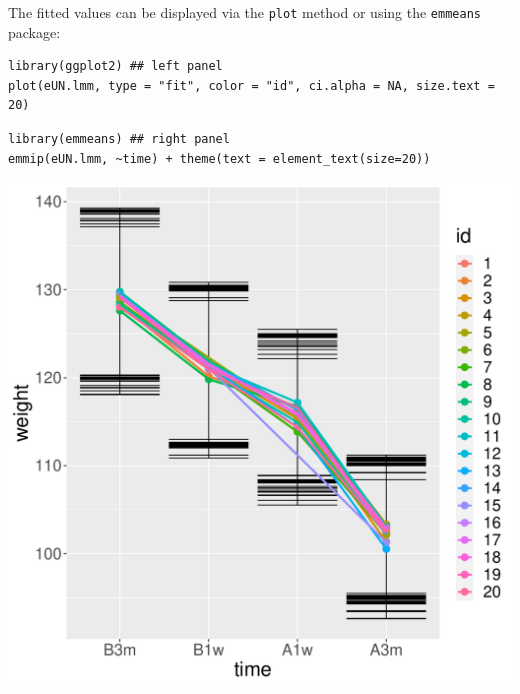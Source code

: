 \documentclass[12pt]{article}
\begin{document}
The fitted values can be displayed via the \texttt{plot} method or using the \texttt{emmeans} package:

\lstset{language=r,label= ,caption= ,captionpos=b,numbers=none}
\begin{lstlisting}
library(ggplot2) ## left panel
plot(eUN.lmm, type = "fit", color = "id", ci.alpha = NA, size.text = 20)
\end{lstlisting}

\lstset{language=r,label= ,caption= ,captionpos=b,numbers=none}
\begin{lstlisting}
library(emmeans) ## right panel
emmip(eUN.lmm, ~time) + theme(text = element_text(size=20))
\end{lstlisting}

\begin{minipage}{0.45\linewidth}
\begin{center}
\includegraphics[width=\textwidth]{./figures/fit-autoplot.pdf}
\end{center}
\end{minipage}
\end{document}
